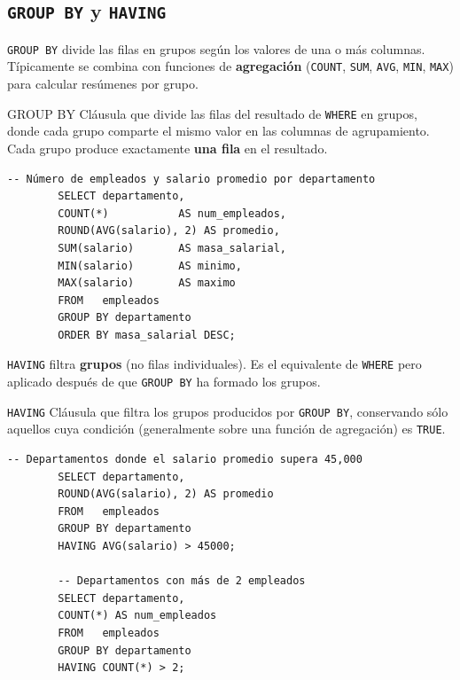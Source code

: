 \documentclass[12pt, a4paper]{article}
\begin{document}
	\subsection{\texttt{GROUP BY} y \texttt{HAVING}}
	
	\texttt{GROUP BY} divide las filas en grupos según los valores
	de una o más columnas. Típicamente se combina con funciones de
	\textbf{agregación} (\texttt{COUNT}, \texttt{SUM}, \texttt{AVG},
	\texttt{MIN}, \texttt{MAX}) para calcular resúmenes por grupo.
	
	\begin{definicion}{GROUP BY}
		Cláusula que divide las filas del resultado de \texttt{WHERE} en
		grupos, donde cada grupo comparte el mismo valor en las columnas
		de agrupamiento.
		Cada grupo produce exactamente \textbf{una fila} en el resultado.
	\end{definicion}
	
	\begin{lstlisting}[caption={GROUP BY con funciones de agregación.}]
		-- Número de empleados y salario promedio por departamento
		SELECT departamento,
		COUNT(*)           AS num_empleados,
		ROUND(AVG(salario), 2) AS promedio,
		SUM(salario)       AS masa_salarial,
		MIN(salario)       AS minimo,
		MAX(salario)       AS maximo
		FROM   empleados
		GROUP BY departamento
		ORDER BY masa_salarial DESC;
	\end{lstlisting}
	
	\texttt{HAVING} filtra \textbf{grupos} (no filas individuales).
	Es el equivalente de \texttt{WHERE} pero aplicado después de que
	\texttt{GROUP BY} ha formado los grupos.
	
	\begin{definicion}{\texttt{HAVING}}
		Cláusula que filtra los grupos producidos por \texttt{GROUP BY},
		conservando sólo aquellos cuya condición (generalmente sobre
		una función de agregación) es \texttt{TRUE}.
	\end{definicion}
	
	\begin{lstlisting}[caption={HAVING: filtrar grupos por condición agregada.}]
		-- Departamentos donde el salario promedio supera 45,000
		SELECT departamento,
		ROUND(AVG(salario), 2) AS promedio
		FROM   empleados
		GROUP BY departamento
		HAVING AVG(salario) > 45000;
		
		-- Departamentos con más de 2 empleados
		SELECT departamento,
		COUNT(*) AS num_empleados
		FROM   empleados
		GROUP BY departamento
		HAVING COUNT(*) > 2;
	\end{lstlisting}
	
\end{document}
